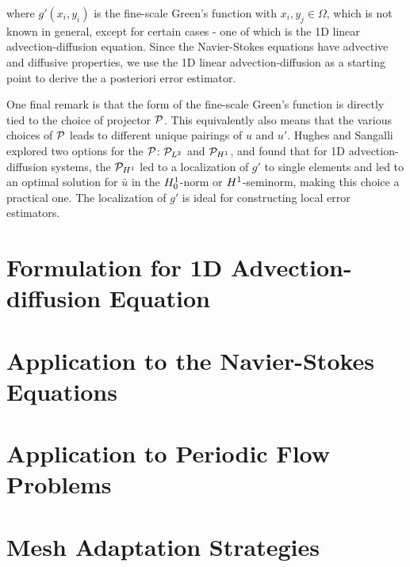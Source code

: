 \noindent where $g'(x_i,y_i)$ is the fine-scale Green's function with $x_i,y_j \in \Omega$, which is not known in general, except for certain cases - one of which is the 1D linear advection-diffusion equation.
Since the Navier-Stokes equations have advective and diffusive properties, we use the 1D linear advection-diffusion as a starting point to derive the a posteriori error estimator.

One final remark is that the form of the fine-scale Green's function is directly tied to the choice of projector $\mathcal{P}$.
This equivalently also means that the various choices of $\mathcal{P}$ leads to different unique pairings of $u$ and $u'$.
Hughes and Sangalli \cite{hughes2007variational} explored two options for the $\mathcal{P}$: $\mathcal{P}_{L^2}$ and $\mathcal{P}_{H^1}$, and found that for 1D advection-diffusion systems, the $\mathcal{P}_{H^1}$ led to a localization of $g'$ to single elements and led to an optimal solution for $\bar{u}$ in the $H^{1}_0$-norm or $H^{1}$-seminorm, making this choice a practical one.
The localization of $g'$ is ideal for constructing local error estimators.

\section{Formulation for 1D Advection-diffusion Equation}

\label{sec:1D_AD}

\section{Application to the Navier-Stokes Equations}


\section{Application to Periodic Flow Problems}

\label{sec:app_to_periodic}

\section{Mesh Adaptation Strategies}

\label{sec:adapt_strat_overview}





